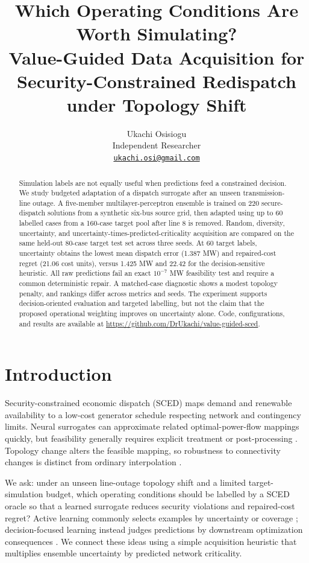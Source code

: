 \documentclass[11pt]{article}
\title{Which Operating Conditions Are Worth Simulating?\\Value-Guided Data Acquisition for Security-Constrained Redispatch under Topology Shift}
\author{Ukachi Osisiogu\\Independent Researcher\\\href{mailto:ukachi.osi@gmail.com}{\texttt{ukachi.osi@gmail.com}}}\date{}
\begin{document}
\maketitle

\begin{abstract}
Simulation labels are not equally useful when predictions feed a constrained decision. We study budgeted adaptation of a dispatch surrogate after an unseen transmission-line outage. A five-member multilayer-perceptron ensemble is trained on 220 secure-dispatch solutions from a synthetic six-bus source grid, then adapted using up to 60 labelled cases from a 160-case target pool after line 8 is removed. Random, diversity, uncertainty, and uncertainty-times-predicted-criticality acquisition are compared on the same held-out 80-case target test set across three seeds. At 60 target labels, uncertainty obtains the lowest mean dispatch error (1.387 MW) and repaired-cost regret (21.06 cost units), versus 1.425 MW and 22.42 for the decision-sensitive heuristic. All raw predictions fail an exact $10^{-7}$ MW feasibility test and require a common deterministic repair. A matched-case diagnostic shows a modest topology penalty, and rankings differ across metrics and seeds. The experiment supports decision-oriented evaluation and targeted labelling, but not the claim that the proposed operational weighting improves on uncertainty alone. Code, configurations, and results are available at \url{https://github.com/DrUkachi/value-guided-sced}.
\end{abstract}

\section{Introduction}
Security-constrained economic dispatch (SCED) maps demand and renewable availability to a low-cost generator schedule respecting network and contingency limits. Neural surrogates can approximate related optimal-power-flow mappings quickly, but feasibility generally requires explicit treatment or post-processing \cite{pan2021deepopf,fioretto2020predicting}. Topology change alters the feasible mapping, so robustness to connectivity changes is distinct from ordinary interpolation \cite{piloto2024canos}.

We ask: under an unseen line-outage topology shift and a limited target-simulation budget, which operating conditions should be labelled by a SCED oracle so that a learned surrogate reduces security violations and repaired-cost regret? Active learning commonly selects examples by uncertainty or coverage \cite{settles2009active}; decision-focused learning instead judges predictions by downstream optimization consequences \cite{wilder2019melding,mandi2022decision}. We connect these ideas using a simple acquisition heuristic that multiplies ensemble uncertainty by predicted network criticality.
\end{document}
